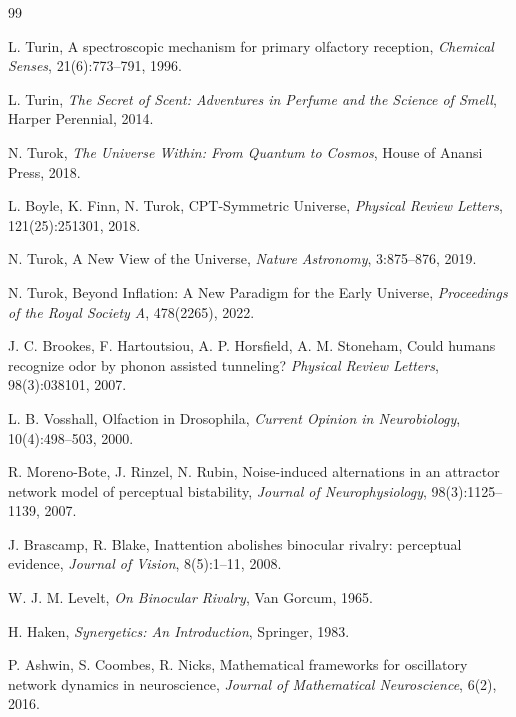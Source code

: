 \documentclass[12pt,a4paper]{article}
\begin{document}
\newpage
\newpage
\begin{thebibliography}{99}

L. Turin,
\newblock A spectroscopic mechanism for primary olfactory reception,
\newblock \emph{Chemical Senses}, 21(6):773--791, 1996.

L. Turin,
\newblock \emph{The Secret of Scent: Adventures in Perfume and the Science of Smell},
\newblock Harper Perennial, 2014.

N. Turok,
\newblock \emph{The Universe Within: From Quantum to Cosmos},
\newblock House of Anansi Press, 2018.

L. Boyle, K. Finn, N. Turok,
\newblock CPT-Symmetric Universe,
\newblock \emph{Physical Review Letters}, 121(25):251301, 2018.

N. Turok,
\newblock A New View of the Universe,
\newblock \emph{Nature Astronomy}, 3:875--876, 2019.

N. Turok,
\newblock Beyond Inflation: A New Paradigm for the Early Universe,
\newblock \emph{Proceedings of the Royal Society A}, 478(2265), 2022.

J. C. Brookes, F. Hartoutsiou, A. P. Horsfield, A. M. Stoneham,
\newblock Could humans recognize odor by phonon assisted tunneling?
\newblock \emph{Physical Review Letters}, 98(3):038101, 2007.

L. B. Vosshall,
\newblock Olfaction in Drosophila,
\newblock \emph{Current Opinion in Neurobiology}, 10(4):498--503, 2000.

R. Moreno-Bote, J. Rinzel, N. Rubin,
\newblock Noise-induced alternations in an attractor network model of perceptual bistability,
\newblock \emph{Journal of Neurophysiology}, 98(3):1125--1139, 2007.

J. Brascamp, R. Blake,
\newblock Inattention abolishes binocular rivalry: perceptual evidence,
\newblock \emph{Journal of Vision}, 8(5):1--11, 2008.

W. J. M. Levelt,
\newblock \emph{On Binocular Rivalry},
\newblock Van Gorcum, 1965.

H. Haken,
\newblock \emph{Synergetics: An Introduction},
\newblock Springer, 1983.

P. Ashwin, S. Coombes, R. Nicks,
\newblock Mathematical frameworks for oscillatory network dynamics in neuroscience,
\newblock \emph{Journal of Mathematical Neuroscience}, 6(2), 2016.


\end{thebibliography}
\end{document}
